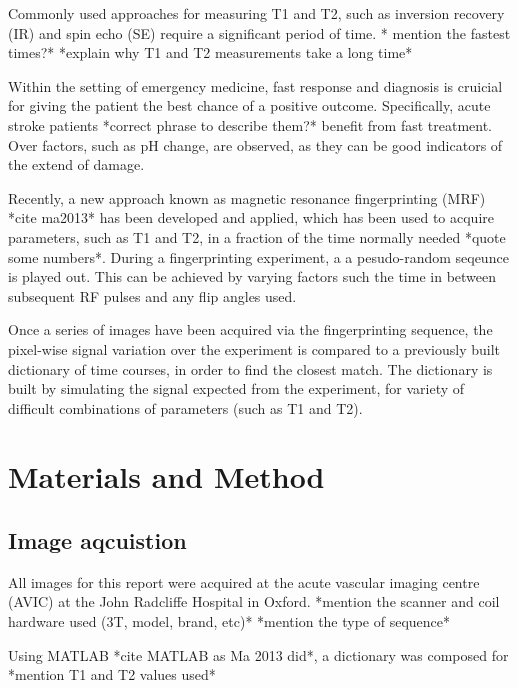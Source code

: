 \documentclass[review]{elsarticle}
\begin{document}
Commonly used approaches for measuring T1 and T2, such as inversion recovery (IR) and spin echo (SE) require a significant period of time. * mention the fastest times?*  *explain why T1 and T2 measurements take a long time* 

Within the setting of emergency medicine, fast response and diagnosis is cruicial for giving the patient the best chance of a positive outcome. Specifically, acute stroke patients *correct phrase to describe them?* benefit from fast treatment. Over factors, such as pH change, are observed, as they can be good indicators of the extend of damage.

Recently, a new approach known as magnetic resonance fingerprinting (MRF) *cite ma2013* has been developed and applied, which has been used to acquire parameters, such as T1 and T2, in a fraction of the time normally needed *quote some numbers*. During a fingerprinting experiment, a a pesudo-random seqeunce is played out. This can be achieved by varying factors such the time in between subsequent RF pulses and any flip angles used.

Once a series of images have been acquired via the fingerprinting sequence, the pixel-wise signal variation over the experiment is compared to a previously built dictionary of time courses, in order to find the closest match. The dictionary is built by simulating the signal expected from the experiment, for variety of difficult combinations of parameters (such as T1 and T2). 


\section{Materials and Method}

\subsection{Image aqcuistion}
All images for this report were acquired at the acute vascular imaging centre (AVIC) at the John Radcliffe Hospital in Oxford.
*mention the scanner and coil hardware used (3T, model, brand, etc)*
*mention the type of sequence*

Using MATLAB *cite MATLAB as Ma 2013 did*, a dictionary was composed for *mention T1 and T2 values used*
\end{document}
